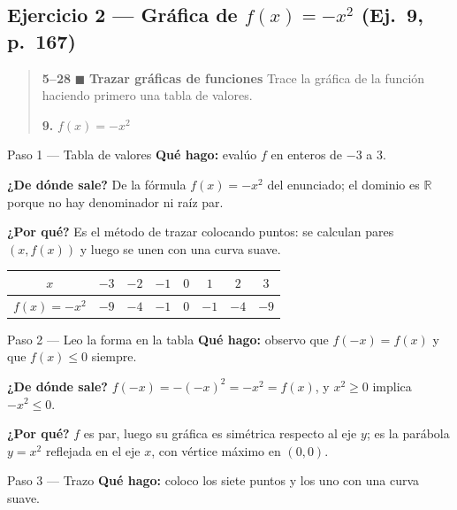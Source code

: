 \documentclass[11pt]{article}
\begin{document}
\subsection*{Ejercicio 2 — Gráfica de $f(x)=-x^2$ (Ej.~9, p.~167)}

\begin{quote}
\textbf{5--28} $\blacksquare$ \textbf{Trazar gráficas de funciones} \quad Trace la gráfica de la función haciendo primero una tabla de valores.

\textbf{9.} $f(x)=-x^2$
\end{quote}

\begin{paso}{Paso 1 --- Tabla de valores}
\textbf{Qué hago:} evalúo $f$ en enteros de $-3$ a $3$.

\textbf{¿De dónde sale?} De la fórmula $f(x)=-x^2$ del enunciado; el dominio es $\mathbb{R}$ porque no hay denominador ni raíz par.

\textbf{¿Por qué?} Es el método de trazar colocando puntos: se calculan pares $(x,f(x))$ y luego se unen con una curva suave.

\begin{center}
\begin{tabular}{|c|c|c|c|c|c|c|c|}
\hline
$x$ & $-3$ & $-2$ & $-1$ & $0$ & $1$ & $2$ & $3$\\\hline
$f(x)=-x^2$ & $-9$ & $-4$ & $-1$ & $0$ & $-1$ & $-4$ & $-9$\\\hline
\end{tabular}
\end{center}
\end{paso}

\begin{paso}{Paso 2 --- Leo la forma en la tabla}
\textbf{Qué hago:} observo que $f(-x)=f(x)$ y que $f(x)\le 0$ siempre.

\textbf{¿De dónde sale?} $f(-x)=-(-x)^2=-x^2=f(x)$, y $x^2\ge0$ implica $-x^2\le 0$.

\textbf{¿Por qué?} $f$ es par, luego su gráfica es simétrica respecto al eje $y$; es la parábola $y=x^2$ reflejada en el eje $x$, con vértice máximo en $(0,0)$.
\end{paso}

\begin{paso}{Paso 3 --- Trazo}
\textbf{Qué hago:} coloco los siete puntos y los uno con una curva suave.

\begin{center}
\end{center}
\end{paso}
\end{document}
